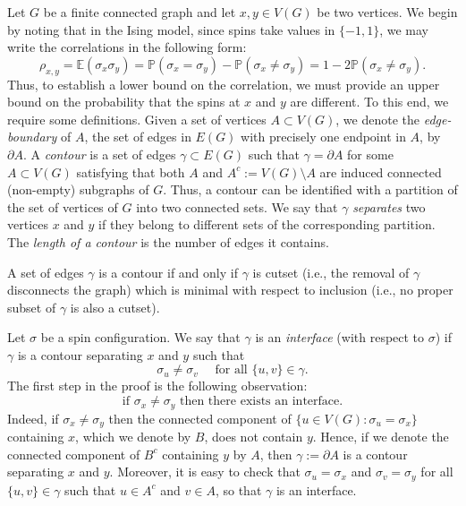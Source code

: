 \documentclass[12pt,reqno]{article}
\def\E{\mathbb{E}}
\renewcommand{\Pr}{\mathbb{P}}
\begin{document}
Let $G$ be a finite connected graph and let $x,y \in V(G)$ be two vertices.
We begin by noting that in the Ising model, since spins take values
in $\{-1,1\}$, we may write the correlations in the following form:
\[ \rho_{x,y} = \E(\sigma_x \sigma_y) = \Pr(\sigma_x = \sigma_y) - \Pr(\sigma_x \neq \sigma_y) = 1 - 2 \Pr(\sigma_x \neq \sigma_y) .\]
Thus, to establish a lower bound on the correlation, we must provide
an upper bound on the probability that the spins at $x$ and $y$ are
different. To this end, we require some definitions.
Given a set of vertices $A \subset V(G)$, we denote the \emph{edge-boundary}
of $A$, the set of edges in $E(G)$ with precisely one endpoint
in $A$, by $\partial A$. A \emph{contour} is a set of edges $\gamma
\subset E(G)$ such that $\gamma = \partial A$ for some $A
\subset V(G)$ satisfying that both $A$ and $A^c := V(G)
\setminus A$ are induced connected (non-empty) subgraphs of $G$. Thus, a
contour can be identified with a partition of the set of vertices of
$G$ into two connected sets. We say that $\gamma$ \emph{separates} two
vertices $x$ and $y$ if they belong to different sets of the
corresponding partition.
The \emph{length of a contour} is the number of
edges it contains.

\medbreak
{}
A set of edges $\gamma$ is a contour if and only if $\gamma$ is cutset (i.e., the removal of $\gamma$ disconnects the graph) which is minimal with respect to inclusion (i.e., no proper subset of $\gamma$ is also a cutset).
\medbreak

Let $\sigma$ be a spin configuration. We say that $\gamma$ is an
\emph{interface} (with respect to $\sigma$) if $\gamma$ is a contour
separating $x$ and $y$ such that
\[ \sigma_u \neq \sigma_v \quad\text{ for all }\{u,v\} \in \gamma .\]
The first step in the proof is the following observation:
\begin{equation}\label{eq:low_temp_Ising_interface_exists}
\text{if $\sigma_x \neq \sigma_y$ then there exists an interface.}
\end{equation}
Indeed, if $\sigma_x \neq \sigma_y$ then the connected component of
$\{ u \in V(G) : \sigma_u = \sigma_x \}$ containing $x$, which
we denote by $B$, does not contain $y$. Hence, if we denote the
connected component of $B^c$ containing $y$ by $A$, then $\gamma :=
\partial A$ is a contour separating $x$ and $y$. Moreover, it is
easy to check that $\sigma_u = \sigma_x$ and $\sigma_v = \sigma_y$
for all $\{u,v\} \in \gamma$ such that $u \in A^c$ and $v \in A$, so
that $\gamma$ is an interface.
\end{document}
